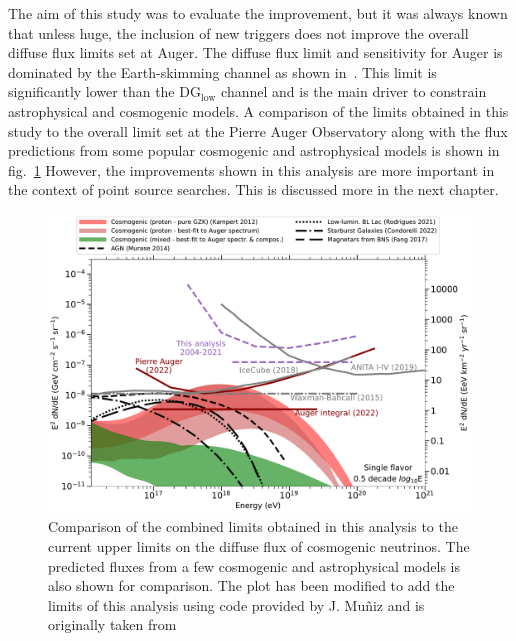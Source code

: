 The aim of this study was to evaluate the improvement, but it was always known that unless huge, the inclusion of new triggers does not improve the overall diffuse flux limits set at Auger. The diffuse flux limit and sensitivity for Auger is dominated by the Earth-skimming channel as shown in~\cite{Aab_2019_diffuse}. This limit is significantly lower than the DG$\mathrm{_{\text{low}}}$ channel and is the main driver to constrain astrophysical and cosmogenic models. A comparison of the limits obtained in this study to the overall limit set at the Pierre Auger Observatory along with the flux predictions from some popular cosmogenic and astrophysical models is shown in fig.~\ref{fig:Limit_comp_overall} However, the improvements shown in this analysis are more important in the context of point source searches. This is discussed more in the next chapter. 

\begin{figure}[h!]
  \centering
  \includegraphics[width=14.5cm]{thesis_figures/ExpLimits/limits_and_models_DGL.pdf}
  \caption{Comparison of the combined limits obtained in this analysis to the current upper limits on the diffuse flux of cosmogenic neutrinos. The predicted fluxes from a few cosmogenic and astrophysical models is also shown for comparison. The plot has been modified to add the limits of this analysis using code provided by J. Muñiz and is originally taken from ~\cite{PierreAuger:2023pjg}}
  \label{fig:Limit_comp_overall}
\end{figure}



